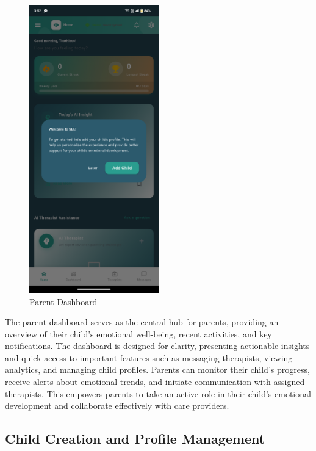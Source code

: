 ﻿\documentclass[12pt,a4paper]{article}
\newcommand{\sectiontitle}[1]{\subsection{#1}}
\begin{document}
\begin{figure}[H]
    \centering
    \includegraphics[width=0.5\textwidth]{Screenshots/parentdashboard.png}
    \caption{Parent Dashboard}
    \label{fig:parent-dashboard}
\end{figure}
The parent dashboard serves as the central hub for parents, providing an overview of their child's emotional well-being, recent activities, and key notifications. The dashboard is designed for clarity, presenting actionable insights and quick access to important features such as messaging therapists, viewing analytics, and managing child profiles. Parents can monitor their child's progress, receive alerts about emotional trends, and initiate communication with assigned therapists. This empowers parents to take an active role in their child's emotional development and collaborate effectively with care providers.

\sectiontitle{Child Creation and Profile Management}
\end{document}

